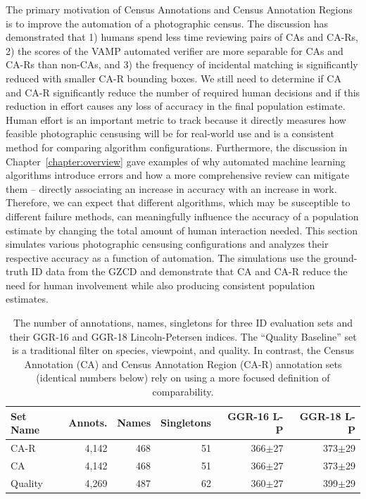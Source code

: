 The primary motivation of Census Annotations and Census Annotation Regions is to improve the automation of a photographic census.  The discussion has demonstrated that 1) humans spend less time reviewing pairs of CAs and CA-Rs, 2) the scores of the VAMP automated verifier are more separable for CAs and CA-Rs than non-CAs, and 3) the frequency of incidental matching is significantly reduced with smaller CA-R bounding boxes.  We still need to determine if CA and CA-R significantly reduce the number of required human decisions and if this reduction in effort causes any loss of accuracy in the final population estimate.  Human effort is an important metric to track because it directly measures how feasible photographic censusing will be for real-world use and is a consistent method for comparing algorithm configurations.  Furthermore, the discussion in Chapter~\ref{chapter:overview} gave examples of why automated machine learning algorithms introduce errors and how a more comprehensive review can mitigate them -- directly associating an increase in accuracy with an increase in work.  Therefore, we can expect that different algorithms, which may be susceptible to different failure methods, can meaningfully influence the accuracy of a population estimate by changing the total amount of human interaction needed.  This section simulates various photographic censusing configurations and analyzes their respective accuracy as a function of automation.  The simulations use the ground-truth ID data from the GZCD and demonstrate that CA and CA-R reduce the need for human involvement while also producing consistent population estimates.

\begin{table}[!t]
    \caption{The number of annotations, names, singletons for three ID evaluation sets and their GGR-16 and GGR-18 Lincoln-Petersen indices.  The ``Quality Baseline'' set is a traditional filter on species, viewpoint, and quality. In contrast, the Census Annotation (CA) and Census Annotation Region (CA-R) annotation sets (identical numbers below) rely on using a more focused definition of comparability.}
    \label{table:census}
    \begin{center}
        \begin{tabular}{| l | r | r | r | r | r |}
            \hline
            \textbf{Set Name} & \textbf{Annots.} & \textbf{Names} & \textbf{Singletons} & \textbf{GGR-16 L-P} & \textbf{GGR-18 L-P} \\
            \hline
            CA-R              & 4,142            & 468            & 51                  & 366$\pm$27          & 373$\pm$29          \\
            \hline
            CA                & 4,142            & 468            & 51                  & 366$\pm$27          & 373$\pm$29          \\
            \hline
            Quality           & 4,269            & 487            & 62                  & 360$\pm$27          & 399$\pm$29          \\
            \hline
        \end{tabular}
    \end{center}
\end{table}

